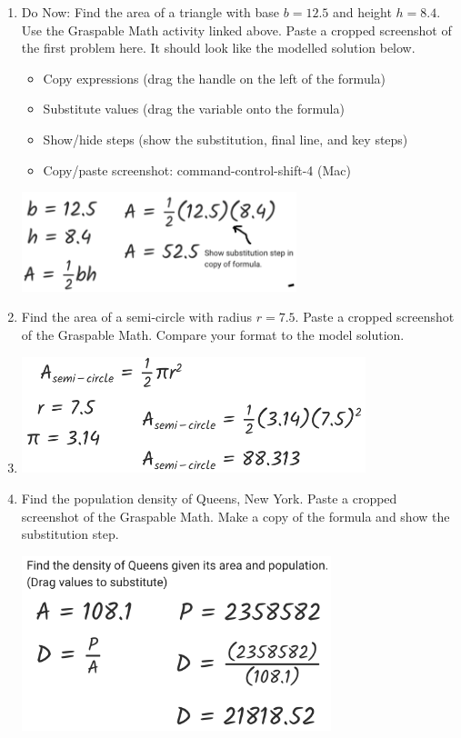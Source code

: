 \begin{enumerate}
\item Do Now: Find the area of a triangle with base $b=12.5$ and height $h=8.4$. Use the Graspable Math activity linked above. Paste a cropped screenshot of the first problem here. It should look like the modelled solution below.
\begin{itemize}[label=$\square$]
  \item Copy expressions (drag the handle on the left of the formula)
  \item Substitute values (drag the variable onto the formula)
  \item Show/hide steps (show the substitution, final line, and key steps)
  \item Copy/paste screenshot: command-control-shift-4 (Mac)
\end{itemize}
\begin{flushright}
  \includegraphics[width=8cm]{../graphics/04model-solution.png}
\end{flushright}

\item Find the area of a semi-circle with radius $r=7.5$. Paste a cropped screenshot of the Graspable Math. Compare your format to the model solution.
\item \vspace{4cm}
\begin{flushright}
  \includegraphics[width=10cm]{../graphics/04asolution.png}
\end{flushright}

\item Find the population density of Queens, New York. Paste a cropped screenshot of the Graspable Math. Make a copy of the formula and show the substitution step.
\vspace{4cm}
\begin{flushright}
  \includegraphics[width=9cm]{../graphics/04solution.png}
\end{flushright}


\end{enumerate}
